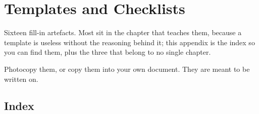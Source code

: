 \chapter{Templates and Checklists}\label{app:templates}

Sixteen fill-in artefacts. Most sit in the chapter that teaches them, because a
template is useless without the reasoning behind it; this appendix is the index
so you can find them, plus the three that belong to no single chapter.

Photocopy them, or copy them into your own document. They are meant to be
written on.

\section{Index}

